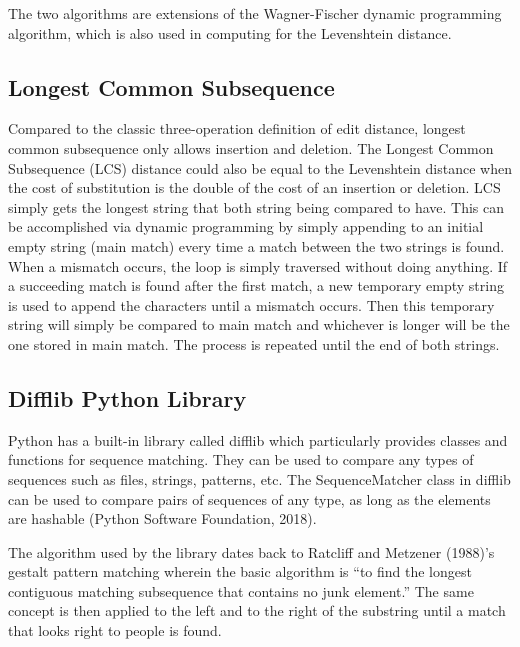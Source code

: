 The two algorithms are extensions of the Wagner-Fischer dynamic programming algorithm, which is also used in computing for the Levenshtein distance.

\subsection{Longest Common Subsequence}
Compared to the classic three-operation definition of edit distance, longest common subsequence only allows insertion and deletion. The Longest Common Subsequence (LCS) distance could also be equal to the Levenshtein distance when the cost of substitution is the double of the cost of an insertion or deletion. LCS simply gets the longest string that both string being compared to have. This can be accomplished via dynamic programming by simply appending to an initial empty string (main match) every time a match between the two strings is found. When a mismatch occurs, the loop is simply traversed without doing anything. If a succeeding match is found after the first match, a new temporary empty string is used to append the characters until a mismatch occurs. Then this temporary string will simply be compared to main match and whichever is longer will be the one stored in main match. The process is repeated until the end of both strings.

\subsection{Difflib Python Library}
Python has a built-in library called difflib which particularly provides classes and functions for sequence matching. They can be used to compare any types of sequences such as files, strings, patterns, etc. The SequenceMatcher class in difflib can be used to compare pairs of sequences of any type, as long as the elements are hashable (Python Software Foundation, 2018).

The algorithm used by the library dates back to Ratcliff and Metzener (1988)’s gestalt pattern matching wherein the basic algorithm is “to find the longest contiguous matching subsequence that contains no junk element.” The same concept is then applied to the left and to the right of the substring until a match that looks right to people is found.

\cite{Dubnov}
\nocite{Azcarraga2016}
\nocite{cambouropoulosEmilios}
\nocite{3dsom}
\nocite{correa}
\nocite{imogen}
\nocite{libin}
\nocite{foote}
\nocite{silla}
\nocite{mcfee}
\nocite{hepokoski}
\nocite{heikkinen}
\nocite{bbc}
\nocite{huron}
\nocite{mckay}
\nocite{mcennis}
\nocite{loughran}
\nocite{lutter}
\nocite{mermelstein}
\nocite{agarwal}
\nocite{iitg}
\nocite{ng}
\nocite{mccria}
\nocite{brownlee}
\nocite{germano}
\nocite{bullinaria}
\nocite{kropotov}
\nocite{grabczewski}
\nocite{gupta}
\nocite{brownlee1}
\nocite{trevino}
\nocite{hartigan}
\nocite{brown}
\nocite{ziv}
\nocite{ron}
\nocite{mitchell}
\nocite{guyon}
\nocite{yang}
\nocite{kohonen}
\nocite{maaten}
\nocite{rumelhart}
\nocite{storkey}
\nocite{gilleland}
\nocite{vidal}
\nocite{ratcliff}
\nocite{difflib}